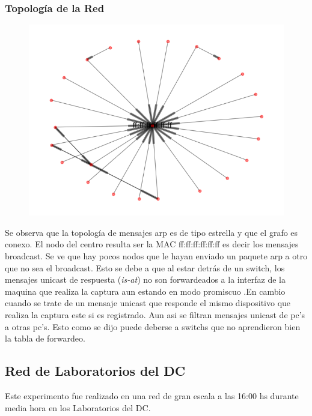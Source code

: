 \subsubsection{Topolog\'ia de la Red}
\begin{figure}[hp!]
	\begin{center}
	 \includegraphics[scale=0.6]{../plots/trabajo_s2_topologia.png}
	\end{center}
\end{figure}

Se observa que la topología de mensajes arp es de tipo estrella
y que el grafo es conexo. El nodo del centro resulta ser la MAC ff:ff:ff:ff:ff:ff
es decir los mensajes broadcast. Se ve que hay pocos nodos que le hayan
enviado un paquete arp a otro que no sea el broadcast. Esto se debe
a que al estar detrás de un switch, los mensajes unicast de respuesta (\textit{is-at})
no son forwardeados a la interfaz de la maquina que realiza la captura aun
estando en modo promiscuo .En cambio cuando se trate de un mensaje unicast que
responde el mismo dispositivo que realiza la captura este si es registrado. Aun
asi se filtran mensajes unicast de pc's a otras pc's. Esto como se dijo puede
deberse a switchs que no aprendieron bien la tabla de forwardeo.

\subsection{Red de Laboratorios del DC}

Este experimento fue realizado en una red de gran escala a las 16:00 hs durante media hora en los Laboratorios del DC.

